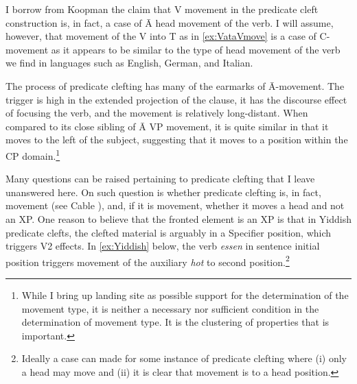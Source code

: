 \documentclass[output=paper,colorlinks,citecolor=brown,
]{langscibook}
\begin{document}
\z

\ea \label{ex:VataVmove}
    \z
\z

I borrow from Koopman the claim that V movement in the predicate cleft construction is, in fact, a case of \=A head movement of the verb.  I will assume, however, that movement of the V into T as in \ref{ex:VataVmove} is a case of C-movement as it appears to be similar to the type of head movement of the verb we find in languages such as English, German, and Italian.  

The process of predicate clefting has many of the earmarks of \=A-movement.  The trigger is high in the extended projection of the clause, it has the discourse effect of focusing the verb, and the movement is relatively long-distant.  When compared to its close sibling of \=A VP movement, it is quite similar in that it moves to the left of the subject, suggesting that it moves to a position within the CP domain.\footnote{While I bring up landing site as possible support for the determination of the movement type, it is neither a necessary nor sufficient condition in the determination of movement type.  It is the clustering of properties that is important.}

Many questions can be raised pertaining to predicate clefting that I leave unanswered here.  On such question is whether predicate clefting is, in fact, movement (see Cable \citeyear{Cable:2004}), and, if it is movement, whether it moves a head and not an XP.  One reason to believe that the fronted element is an XP is that in Yiddish predicate clefts, the clefted material is arguably in a Specifier position, which triggers V2 effects.  In \ref{ex:Yiddish} below, the verb \textit{essen} in sentence initial position triggers movement of the auxiliary \textit{hot} to second position.\footnote{Ideally a case can made for some instance of predicate clefting where (i) only a head may move and (ii) it is clear that movement is to a head position.}
\end{document}
